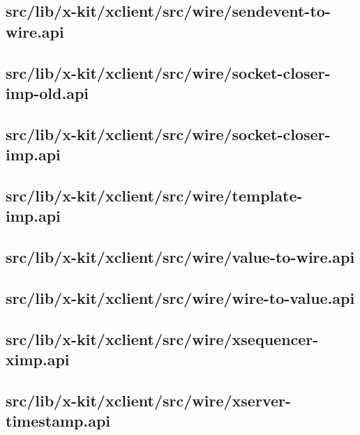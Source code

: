 \subsection{src/lib/x-kit/xclient/src/wire/sendevent-to-wire.api}


\subsection{src/lib/x-kit/xclient/src/wire/socket-closer-imp-old.api}


\subsection{src/lib/x-kit/xclient/src/wire/socket-closer-imp.api}


\subsection{src/lib/x-kit/xclient/src/wire/template-imp.api}


\subsection{src/lib/x-kit/xclient/src/wire/value-to-wire.api}


\subsection{src/lib/x-kit/xclient/src/wire/wire-to-value.api}


\subsection{src/lib/x-kit/xclient/src/wire/xsequencer-ximp.api}


\subsection{src/lib/x-kit/xclient/src/wire/xserver-timestamp.api}


